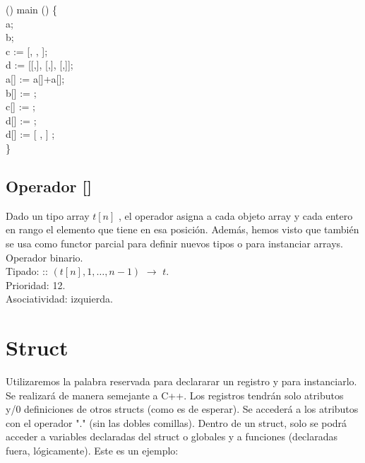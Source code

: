\begin{algorithm}
	\Void () main () \{\\
	\quad \Integer{[\const{1}]} a;  \\
	\quad \Integer{[\const{5}]} b;  \\
	\quad \Integer{[\const{3}]} c := [, , ];  \\
	\quad \Integer{[\const{3}][\const{2}]} d := [[,], [,], [,]];  \\
	\quad a[] := a[]+a[];  \\
	\quad b[] := ;  \\
	\quad c[] := ;  \\
	\quad d[] := ;  \\
	\quad d[] := [ , ] ; \\
	\}\;
\end{algorithm}

\subsection*{Operador []}
Dado un tipo array $t[n]$ , el operador \operator{[]} asigna a cada objeto array y cada entero en rango el elemento que tiene en esa posición. Además, hemos visto que también se usa como functor parcial para definir nuevos tipos o para instanciar arrays.
\\Operador  binario.
\\Tipado: \operator{[]} :: 
$(t[n], {1,\dots,n-1})$
$\rightarrow$ $t$. 
\\Prioridad: 12.
\\Asociatividad: izquierda.

\section{Struct}
Utilizaremos la palabra reservada \Struct para declararar un registro y para instanciarlo. Se realizará de manera semejante a C++. Los registros tendrán
solo atributos y/0 definiciones de otros structs (como es de esperar). Se accederá a los atributos con el operador "." (sin las dobles comillas). Dentro de un struct, solo se podrá acceder
a variables declaradas del struct o globales y a funciones (declaradas fuera, lógicamente). Este es un ejemplo:


